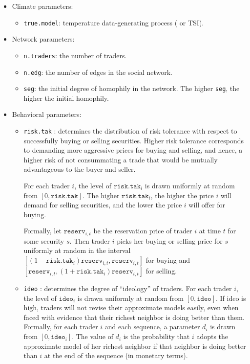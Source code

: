 \documentclass{wscpaperproc}\usepackage[]{graphicx}\usepackage[]{color}
\begin{document}
\begin{itemize}
  \item Climate parameters:
  \begin{itemize}
    \item  \texttt{true.model}: temperature data-generating process ( or TSI).
  \end{itemize}
  \item Network parameters:
  \begin{itemize}
    \item  \texttt{n.traders}: the number of traders.
    \item  \texttt{n.edg}: the number of edges in the social network.
    \item  \texttt{seg}: the initial degree of homophily in the network. 
    The higher  \texttt{seg}, the higher the initial homophily. 
  \end{itemize}
    
  \item Behavioral parameters:
  \begin{itemize}
    \item  \texttt{risk.tak} : determines the distribution of risk tolerance with respect to successfully buying or selling securities.     Higher risk tolerance corresponds to demanding more aggressive prices for buying and selling, and hence, a higher risk of not consummating a trade that would be mutually advantageous to the buyer and seller.
    
    For each trader $i$, the level of $\texttt{risk.tak}_i$ is drawn uniformly at random from $[0,\texttt{risk.tak}]$.
    The higher $\texttt{risk.tak}_i$, the higher the price $i$ will demand for selling securities, and the lower the price $i$ will offer for buying.
    
    Formally, let $\texttt{reserv}_{i,t}$ be the reservation price of trader $i$ at time $t$ for some security $s$.
    Then trader $i$ picks her buying or selling price for $s$ uniformly at random in the interval  
    $[(1 - \texttt{risk.tak}_i) \texttt{reserv}_{i,t}, \allowbreak  \texttt{reserv}_{i,t}]$ for buying and 
    $[\texttt{reserv}_{i,t}, \allowbreak (1  + \texttt{risk.tak}_i) \texttt{reserv}_{i,t}]$ for selling. 
  \item  \texttt{ideo} :  determines the degree of ``ideology'' of traders.
    For each trader $i$, the level of $\texttt{ideo}_i$ is drawn uniformly at random from $[0,\texttt{ideo}]$.
    If ideo is high, traders will not revise their approximate models easily, even when faced with evidence that their richest neighbor is doing better than them. 
    Formally, for each trader $i$ and each sequence, a parameter $d_{i}$ is drawn from $[0, \texttt{ideo}_i]$. 
    The value of $d_{i}$ is the probability that $i$ adopts the approximate model of her richest neighbor if that neighbor is doing better than $i$ at the end of the sequence (in monetary terms).
  \end{itemize}
\end{itemize}
\end{document}
